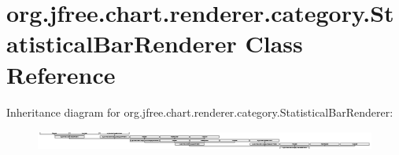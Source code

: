 \hypertarget{classorg_1_1jfree_1_1chart_1_1renderer_1_1category_1_1_statistical_bar_renderer}{}\section{org.\+jfree.\+chart.\+renderer.\+category.\+Statistical\+Bar\+Renderer Class Reference}
\label{classorg_1_1jfree_1_1chart_1_1renderer_1_1category_1_1_statistical_bar_renderer}
Inheritance diagram for org.\+jfree.\+chart.\+renderer.\+category.\+Statistical\+Bar\+Renderer\+:\begin{figure}[H]
\begin{center}
\leavevmode
\includegraphics[height=0.656045cm]{classorg_1_1jfree_1_1chart_1_1renderer_1_1category_1_1_statistical_bar_renderer}
\end{center}
\end{figure}
